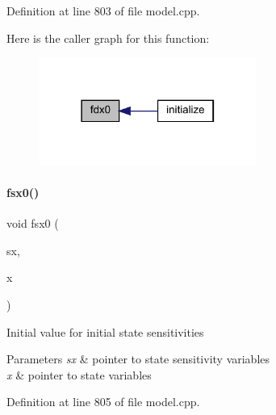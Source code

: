 Definition at line 803 of file model.\+cpp.

Here is the caller graph for this function\+:
\nopagebreak
\begin{figure}[H]
\begin{center}
\leavevmode
\includegraphics[width=202pt]{classamici_1_1_model_a8c3a1647a75581d9e2fc5de106d87a0d_icgraph}
\end{center}
\end{figure}
\mbox{\label{classamici_1_1_model_a6f46a63f0524ad25e4125254b78fdee9}} 
\paragraph{\texorpdfstring{fsx0()}{fsx0()}\hspace{0.1cm}{\footnotesize\ttfamily [1/2]}}
{\footnotesize\ttfamily void fsx0 (\begin{DoxyParamCaption}\item[{\mbox{\hyperlink{classamici_1_1_ami_vector_array}{Ami\+Vector\+Array}} $\ast$}]{sx,  }\item[{const \mbox{\hyperlink{classamici_1_1_ami_vector}{Ami\+Vector}} $\ast$}]{x }\end{DoxyParamCaption})}

Initial value for initial state sensitivities 
\begin{DoxyParams}{Parameters}
{\em sx} & pointer to state sensitivity variables \\
\hline
{\em x} & pointer to state variables \\
\hline
\end{DoxyParams}


Definition at line 805 of file model.\+cpp.

